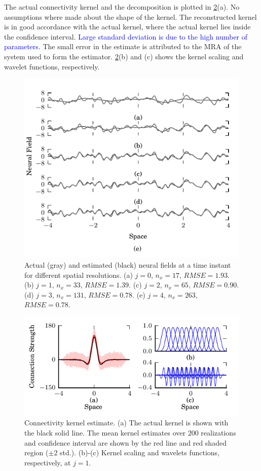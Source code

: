 \documentclass[journal]{IEEEtran}
\newcommand{\parham}[1]{\textcolor{blue}{#1}}
\begin{document}
The actual connectivity kernel and the decomposition is plotted in \figurename{\ref{fig:KernelEstimate}}(a). No assumptions where made about the shape of the kernel. The reconstructed kernel is in good accordance with the actual kernel, where the actual kernel lies inside the confidence interval. \parham{Large standard deviation is due to the high number of parameters.} The small error in the estimate is attributed to the MRA of the system used to form the estimator. \figurename{\ref{fig:KernelEstimate}}(b) and (c) shows the kernel scaling and wavelet functions, respectively.
\begin{figure}[!h] 
	\centering
		\includegraphics[scale=1]{./Graph/fig1.pdf}
		\caption{Actual (gray) and estimated (black) neural fields at a time instant for different spatial resolutions. (a) $j=0$, $n_x=17$, $RMSE = 1.93$. (b) $j=1$, $n_x=33$, $RMSE = 1.39$. (c) $j=2$, $n_x=65$, $RMSE = 0.90$. (d) $j=3$, $n_x=131$, $RMSE = 0.78$. (e) $j=4$, $n_x=263$, $RMSE=0.78$.}
	\label{fig:FieldEstimates}
\end{figure} 
\begin{figure}[!h] 
	\centering
		\includegraphics[scale=1]{./Graph/fig2.pdf}
		\caption{Connectivity kernel estimate. (a) The actual kernel is shown with the black solid line. The mean kernel estimates over 200 realizations and confidence interval are shown by the red line and red shaded region ($\pm2$ std.). (b)-(c) Kernel scaling and wavelets functions, respectively, at $j=1$.}
	\label{fig:KernelEstimate}
\end{figure}
\end{document}

